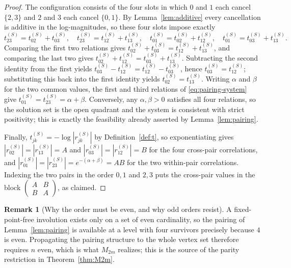 \documentclass[11pt]{article}
\theoremstyle{plain}
\theoremstyle{definition}
\newtheorem{remark}[theorem]{Remark}
\begin{document}
\begin{aiblock}
\begin{proof}
The configuration consists of the four slots in which $0$ and $1$ each cancel $\{2,3\}$ and $2$ and $3$
each cancel $\{0,1\}$. By Lemma~\ref{lem:additive} every cancellation is additive in the
log-magnitudes, so these four slots impose exactly
\begin{equation}\label{eq:pairing-system}
  t^{(S)}_{23}=t^{(S)}_{02}+t^{(S)}_{03},\quad
  t^{(S)}_{23}=t^{(S)}_{12}+t^{(S)}_{13},\quad
  t^{(S)}_{01}=t^{(S)}_{02}+t^{(S)}_{12},\quad
  t^{(S)}_{01}=t^{(S)}_{03}+t^{(S)}_{13}.
\end{equation}
Comparing the first two relations gives $t^{(S)}_{02}+t^{(S)}_{03}=t^{(S)}_{12}+t^{(S)}_{13}$, and
comparing the last two gives $t^{(S)}_{02}+t^{(S)}_{12}=t^{(S)}_{03}+t^{(S)}_{13}$. Subtracting the
second identity from the first yields $t^{(S)}_{03}-t^{(S)}_{12}=t^{(S)}_{12}-t^{(S)}_{03}$, hence
$t^{(S)}_{03}=t^{(S)}_{12}$; substituting this back into the first identity yields
$t^{(S)}_{02}=t^{(S)}_{13}$. Writing $\alpha$ and $\beta$ for the two common values, the first and
third relations of \eqref{eq:pairing-system} give $t^{(S)}_{01}=t^{(S)}_{23}=\alpha+\beta$. Conversely,
any $\alpha,\beta>0$ satisfies all four relations, so the solution set is the open quadrant and the
system is consistent with strict positivity; this is exactly the feasibility already asserted by
Lemma~\ref{lem:pairing}.

Finally, $t^{(S)}_{jk}=-\log|r^{(S)}_{jk}|$ by Definition~\ref{def:t}, so exponentiating gives
$|r^{(S)}_{02}|=|r^{(S)}_{13}|=A$ and $|r^{(S)}_{03}|=|r^{(S)}_{12}|=B$ for the four cross-pair
correlations, and $|r^{(S)}_{01}|=|r^{(S)}_{23}|=e^{-(\alpha+\beta)}=AB$ for the two within-pair
correlations. Indexing the two pairs in the order $0,1$ and $2,3$ puts the cross-pair values in the
block $\begin{pmatrix}A&B\\B&A\end{pmatrix}$, as claimed.
\end{proof}

\begin{remark}[Why the order must be even, and why odd orders resist]\label{rem:even-needed}
A fixed-point-free involution exists only on a set of even cardinality, so the pairing of
Lemma~\ref{lem:pairing} is available at a level with four survivors precisely because $4$ is even.
Propagating the pairing structure to the whole vertex set therefore requires $n$ even, which is what
$M_{2m}$ realizes; this is the source of the parity restriction in Theorem~\ref{thm:M2m}.


\end{remark}
\end{aiblock}
\end{document}
